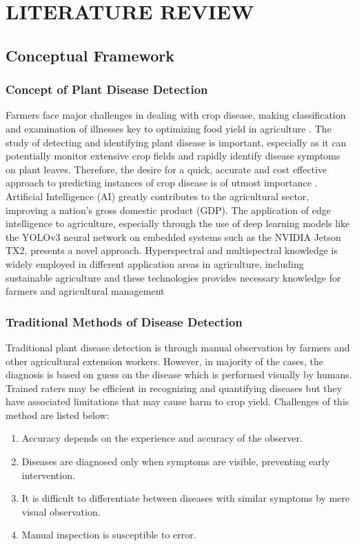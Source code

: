\chapter {\nameTitleSpace LITERATURE REVIEW}
\chpterTitleSection
\section{Conceptual Framework}
\sectionTitleBody
\subsection{Concept of Plant Disease Detection}
\sectionTitleBody
Farmers face major challenges in dealing with crop disease,
	making classification and examination of illnesses key to optimizing
	food yield in agriculture \citep{chenIdentificationFruitTree2021a}. The study of detecting
	and identifying plant disease is important, especially as it can potentially
	monitor extensive crop fields and rapidly identify disease symptoms
	on plant leaves. Therefore, the desire for a quick, accurate and cost
	effective approach to predicting instances of crop disease is of utmost
	importance \citep{chenIdentificationFruitTree2021a}. Artificial Intelligence (AI) greatly
	contributes to the agricultural sector, improving a nation\textquoteright s
	gross domestic product (GDP). The application of edge intelligence
	to agriculture, especially through the use of deep learning models
	like the YOLOv3 neural network on embedded systems such as the NVIDIA
	Jetson TX2, presents a novel approach. Hyperspectral and multispectral
	knowledge is widely employed in different application areas in agriculture,
	including sustainable agriculture and these technologies provides necessary
	knowledge for farmers and agricultural management \citep{angBigDataMachine2021a}


\subsection{Traditional Methods of Disease Detection} \sectionTitleBody
Traditional plant disease detection is through manual observation
	by farmers and other agricultural extension workers. However, in majority
	of the cases, the diagnosis is based on guess on the disease which
	is performed visually by humans. Trained raters may be efficient in
	recognizing and quantifying diseases but they have associated limitations
	that may cause harm to crop yield. Challenges of this method are listed
	below: 
\begin{enumerate}
	\item Accuracy depends on the experience and accuracy of the observer.

	\item Diseases are diagnosed only when symptoms are visible, preventing
	early intervention. 

	\item It is difficult to differentiate between diseases
	with similar symptoms by mere visual observation. 
	
	\item  Manual inspection is susceptible to error. 
\end{enumerate}

